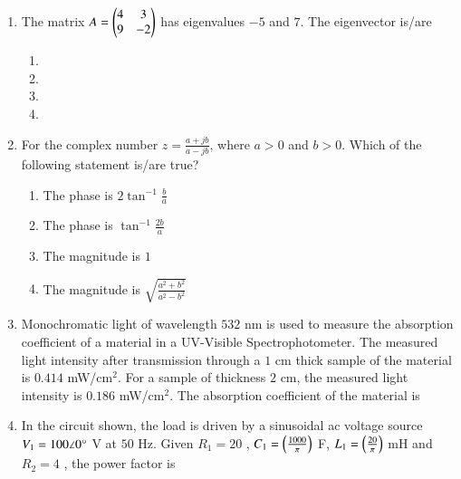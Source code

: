 \documentclass[journal,12pt,onecolumn]{IEEEtran}
\theoremstyle{remark}
\begin{document}
\begin{enumerate}
\item The matrix $A = \begin{pmatrix}4 & 3 \\ 9 & -2\end{pmatrix}$ has eigenvalues $-5$ and $7$. The eigenvector is/are \underline{\hspace{2cm}}

\hfill{}
\begin{enumerate}
\item {}
\item {}
\item {}
\item {}
\end{enumerate}

\item For the complex number $z = \frac{a+jb}{a-jb}$, where $a>0$ and $b>0$. Which of the following statement is/are true?

\hfill{}
\begin{enumerate}
\item The phase is $2 \tan^{-1} \frac{b}{a}$
\item The phase is $\tan^{-1} \frac{2b}{a}$
\item The magnitude is $1$
\item The magnitude is $\sqrt{\frac{a^2+b^2}{a^2-b^2}}$
\end{enumerate}

\item Monochromatic light of wavelength $532$ nm is used to measure the absorption coefficient of a material in a UV-Visible Spectrophotometer. The measured light intensity after transmission through a $1$ cm thick sample of the material is $0.414$ mW/cm$^2$. For a sample of thickness $2$ cm, the measured light intensity is $0.186$ mW/cm$^2$. The absorption coefficient  of the material is \underline{\hspace{2cm}} 

\hfill{}

\item In the circuit shown, the load is driven by a sinusoidal ac voltage source $V_1 = 100 \angle 0\degree$ V at $50$ Hz. Given $R_1 = 20$ \ohm, $C_1 = \left(\frac{1000}{\pi}\right)$ \textmu F, $L_1 = \left(\frac{20}{\pi}\right)$ mH and $R_2 = 4$ \ohm, the power factor is \underline{\hspace{2cm}} 


\end{enumerate}
\end{document}
